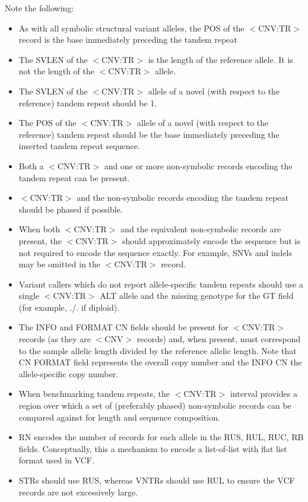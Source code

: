 \documentclass[8pt]{article}
\begin{document}
Note the following:
\begin{itemize}
    \item As with all symbolic structural variant alleles, the POS of the $<$CNV:TR$>$ record is the base immediately preceding the tandem repeat
    \item The SVLEN of the $<$CNV:TR$>$ is the length of the reference allele.
    It is not the length of the $<$CNV:TR$>$ allele.
    \item The SVLEN of the $<$CNV:TR$>$ allele of a novel (with respect to the reference) tandem repeat should be 1.
    \item The POS of the $<$CNV:TR$>$ allele of a novel (with respect to the reference) tandem repeat should be the base immediately preceding the inserted tandem repeat sequence.
    \item Both a $<$CNV:TR$>$ and one or more non-symbolic records encoding the tandem repeat can be present.
    \item $<$CNV:TR$>$ and the non-symbolic records encoding the tandem repeat should be phased if possible.
    \item When both $<$CNV:TR$>$ and the equivalent non-symbolic records are present, the $<$CNV:TR$>$ should approximately encode the sequence but is not required to encode the sequence exactly.
	For example, SNVs and indels may be omitted in the $<$CNV:TR$>$ record.
    \item Variant callers which do not report allele-specific tandem repeats should use a single $<$CNV:TR$>$ ALT allele and the missing genotype for the GT field (for example, $./.$ if diploid).
    \item The INFO and FORMAT CN fields should be present for $<$CNV:TR$>$ records (as they are $<$CNV$>$ records) and, when present, must correspond to the sample allelic length divided by the reference allelic length.
	Note that CN FORMAT field represents the overall copy number and the INFO CN the allele-specific copy number.
    \item When benchmarking tandem repeats, the $<$CNV:TR$>$ interval provides a region over which a set of (preferably phased) non-symbolic records can be compared against for length and sequence composition.
    \item RN encodes the number of records for each allele in the RUS, RUL, RUC, RB fields.
	Conceptually, this a mechanism to encode a list-of-list with flat list format used in VCF.
    \item STRs should use RUS, whereas VNTRs should use RUL to ensure the VCF records are not excessively large.

\end{itemize}
\end{document}
